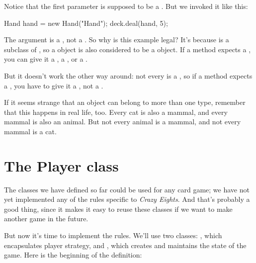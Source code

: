 Notice that the first parameter is supposed to be a .
But we invoked it like this:

\begin{code}
Hand hand = new Hand("Hand");
deck.deal(hand, 5);
\end{code}

The argument is a , not a .
So why is this example legal?
It's because  is a subclass of , so a  object is also considered to be a  object.
If a method expects a , you can give it a , a , or a .

But it doesn't work the other way around: not every  is a , so if a method expects a , you have to give it a , not a .

If it seems strange that an object can belong to more than one type, remember that this happens in real life, too.
Every cat is also a mammal, and every mammal is also an animal.
But not every animal is a mammal, and not every mammal is a cat.




\section{The Player class}

The classes we have defined so far could be used for any card game; we have not yet implemented any of the rules specific to {\it Crazy Eights}.
And that's probably a good thing, since it makes it easy to reuse these classes if we want to make another game in the future.

But now it's time to implement the rules.
We'll use two classes: , which encapsulates player strategy, and , which creates and maintains the state of the game.
Here is the beginning of the  definition:

\begin{code}
public class Player {

    private String name;
    private Hand hand;

    public Player(String name) {
        this.name = name;
        this.hand = new Hand(name);
    }
\end{code}


